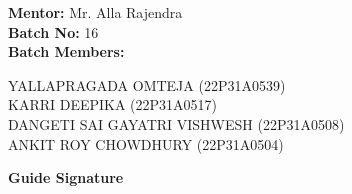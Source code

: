 \noindent
\textbf{Mentor:} Mr. Alla Rajendra\\
\textbf{Batch No:} 16\\
\textbf{Batch Members:}

\vspace{0.2cm}

\noindent
YALLAPRAGADA OMTEJA (22P31A0539)\\
KARRI DEEPIKA (22P31A0517)\\
DANGETI SAI GAYATRI VISHWESH (22P31A0508)\\
ANKIT ROY CHOWDHURY (22P31A0504)

\vspace{1.5cm}

\begin{flushright}
\textbf{Guide Signature}
\end{flushright}